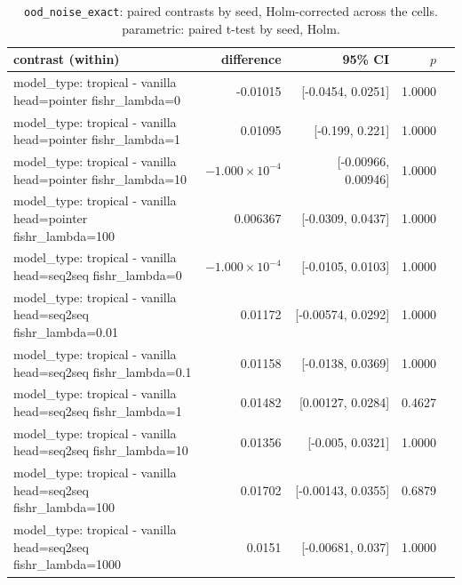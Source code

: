 \documentclass[10pt]{article}
\makeatletter
\newcommand{\stackcell}[1]{\begin{tabular}[t]{@{}l@{}}#1\end{tabular}}
\makeatother
\begin{document}
{\small
\begin{longtable}{lrrrl}
\caption{\texttt{ood\_noise\_exact}: paired contrasts by seed, Holm-corrected across the cells. parametric: paired t-test by seed, Holm.}\label{tab:paired-ood_noise_exact}\\
\toprule
contrast (within) & difference & 95\% CI & $p$ & \\
\midrule
\endhead
\stackcell{model\_type: tropical - vanilla\\\footnotesize head=pointer fishr\_lambda=0 } & -0.01015 & [-0.0454, 0.0251] & 1.0000 & \\
\stackcell{model\_type: tropical - vanilla\\\footnotesize head=pointer fishr\_lambda=1 } & 0.01095 & [-0.199, 0.221] & 1.0000 & \\
\stackcell{model\_type: tropical - vanilla\\\footnotesize head=pointer fishr\_lambda=10 } & $-1.000\times10^{-4}$ & [-0.00966, 0.00946] & 1.0000 & \\
\stackcell{model\_type: tropical - vanilla\\\footnotesize head=pointer fishr\_lambda=100 } & 0.006367 & [-0.0309, 0.0437] & 1.0000 & \\
\stackcell{model\_type: tropical - vanilla\\\footnotesize head=seq2seq fishr\_lambda=0 } & $-1.000\times10^{-4}$ & [-0.0105, 0.0103] & 1.0000 & \\
\stackcell{model\_type: tropical - vanilla\\\footnotesize head=seq2seq fishr\_lambda=0.01 } & 0.01172 & [-0.00574, 0.0292] & 1.0000 & \\
\stackcell{model\_type: tropical - vanilla\\\footnotesize head=seq2seq fishr\_lambda=0.1 } & 0.01158 & [-0.0138, 0.0369] & 1.0000 & \\
\stackcell{model\_type: tropical - vanilla\\\footnotesize head=seq2seq fishr\_lambda=1 } & 0.01482 & [0.00127, 0.0284] & 0.4627 & \\
\stackcell{model\_type: tropical - vanilla\\\footnotesize head=seq2seq fishr\_lambda=10 } & 0.01356 & [-0.005, 0.0321] & 1.0000 & \\
\stackcell{model\_type: tropical - vanilla\\\footnotesize head=seq2seq fishr\_lambda=100 } & 0.01702 & [-0.00143, 0.0355] & 0.6879 & \\
\stackcell{model\_type: tropical - vanilla\\\footnotesize head=seq2seq fishr\_lambda=1000 } & 0.0151 & [-0.00681, 0.037] & 1.0000 & \\

\end{longtable}}
\end{document}
